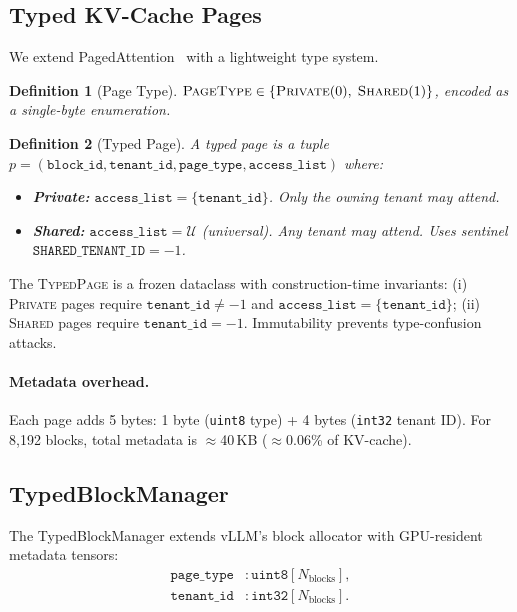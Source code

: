 \documentclass[11pt]{article}
\newtheorem{definition}{Definition}
\begin{document}
\subsection{Typed KV-Cache Pages}
\label{sec:design:pages}

We extend PagedAttention~\citep{kwon2023vllm} with a lightweight type system.

\begin{definition}[Page Type]
$\textsc{PageType} \in \{\textsc{Private}(0),\; \textsc{Shared}(1)\}$, encoded as a single-byte enumeration.
\end{definition}

\begin{definition}[Typed Page]
A typed page is a tuple $p = (\texttt{block\_id}, \texttt{tenant\_id}, \texttt{page\_type}, \texttt{access\_list})$ where:
\begin{itemize}[leftmargin=*,itemsep=2pt]
    \item \textbf{Private:} $\texttt{access\_list} = \{\texttt{tenant\_id}\}$. Only the owning tenant may attend.
    \item \textbf{Shared:} $\texttt{access\_list} = \mathcal{U}$ (universal). Any tenant may attend. Uses sentinel $\texttt{SHARED\_TENANT\_ID} = -1$.
\end{itemize}
\end{definition}

The \textsc{TypedPage} is a frozen dataclass with construction-time invariants: (i) \textsc{Private} pages require $\texttt{tenant\_id} \neq -1$ and $\texttt{access\_list} = \{\texttt{tenant\_id}\}$; (ii) \textsc{Shared} pages require $\texttt{tenant\_id} = -1$. Immutability prevents type-confusion attacks.

\paragraph{Metadata overhead.} Each page adds 5 bytes: 1 byte (\texttt{uint8} type) + 4 bytes (\texttt{int32} tenant ID). For 8,192 blocks, total metadata is $\approx$40\,KB ($\approx$0.06\% of KV-cache).

\subsection{TypedBlockManager}
\label{sec:design:manager}

The TypedBlockManager extends vLLM's block allocator with GPU-resident metadata tensors:
\begin{align}
    \texttt{page\_type} &: \texttt{uint8}[N_{\mathrm{blocks}}], \\
    \texttt{tenant\_id} &: \texttt{int32}[N_{\mathrm{blocks}}].
\end{align}
\end{document}
